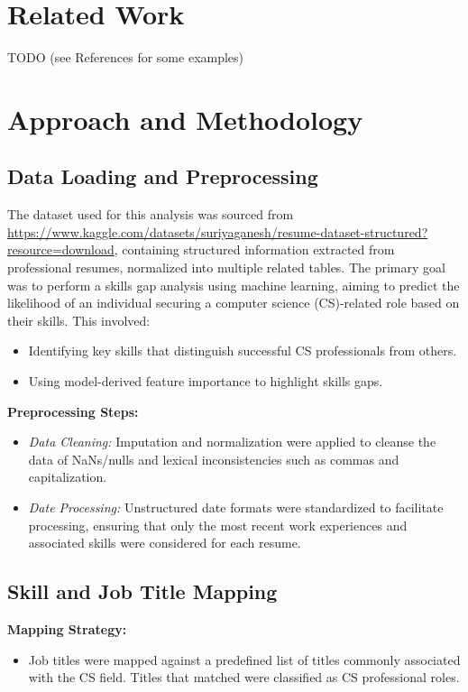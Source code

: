 \documentclass[11pt]{article}
\begin{document}
\section{Related Work}
TODO (see References for some examples)
\section{Approach and Methodology}

\subsection{Data Loading and Preprocessing}

The dataset used for this analysis was sourced from \url{https://www.kaggle.com/datasets/suriyaganesh/resume-dataset-structured?resource=download}, containing structured information extracted from professional resumes, normalized into multiple related tables. The primary goal was to perform a skills gap analysis using machine learning, aiming to predict the likelihood of an individual securing a computer science (CS)-related role based on their skills. This involved:

\begin{itemize}
    \item Identifying key skills that distinguish successful CS professionals from others.
    \item Using model-derived feature importance to highlight skills gaps.
\end{itemize}

\textbf{Preprocessing Steps:}
\begin{itemize}
    \item \textit{Data Cleaning:} Imputation and normalization were applied to cleanse the data of NaNs/nulls and lexical inconsistencies such as commas and capitalization.
    \item \textit{Date Processing:} Unstructured date formats were standardized to facilitate processing, ensuring that only the most recent work experiences and associated skills were considered for each resume.
\end{itemize}

\subsection{Skill and Job Title Mapping}

\textbf{Mapping Strategy:}
\begin{itemize}
    \item Job titles were mapped against a predefined list of titles commonly associated with the CS field. Titles that matched were classified as CS professional roles.
\end{itemize}
\end{document}
